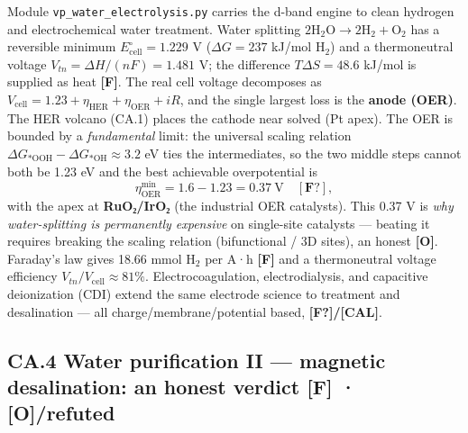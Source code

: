 \documentclass[
  10pt,
]{article}
\begin{document}
Module \texttt{vp\_water\_electrolysis.py} carries the d-band engine to
clean hydrogen and electrochemical water treatment. Water splitting
\(\mathrm{2H_2O\to2H_2+O_2}\) has a reversible minimum
\(E^\circ_{\text{cell}}=1.229\) V (\(\Delta G=237\) kJ/mol H\(_2\)) and
a thermoneutral voltage \(V_{tn}=\Delta H/(nF)=1.481\) V; the difference
\(T\Delta S=48.6\) kJ/mol is supplied as heat \textbf{{[}F{]}}. The real
cell voltage decomposes as
\(V_{\text{cell}}=1.23+\eta_{\text{HER}}+\eta_{\text{OER}}+iR\), and the
single largest loss is the \textbf{anode (OER)}. The HER volcano (CA.1)
places the cathode near solved (Pt apex). The OER is bounded by a
\emph{fundamental} limit: the universal scaling relation
\(\Delta G_{*\mathrm{OOH}}-\Delta G_{*\mathrm{OH}}\approx 3.2\) eV ties
the intermediates, so the two middle steps cannot both be 1.23 eV and
the best achievable overpotential is
\[ \eta_{\text{OER}}^{\min} = 1.6 - 1.23 = 0.37\ \text{V} \quad[\mathbf{F?}], \]
with the apex at \textbf{RuO₂/IrO₂} (the industrial OER catalysts). This
0.37 V is \emph{why water-splitting is permanently expensive} on
single-site catalysts --- beating it requires breaking the scaling
relation (bifunctional / 3D sites), an honest \textbf{{[}O{]}}.
Faraday's law gives 18.66 mmol H\(_2\) per A·h \textbf{{[}F{]}} and a
thermoneutral voltage efficiency \(V_{tn}/V_{\text{cell}}\approx 81\%\).
Electrocoagulation, electrodialysis, and capacitive deionization (CDI)
extend the same electrode science to treatment and desalination --- all
charge/membrane/potential based, \textbf{{[}F?{]}/{[}CAL{]}}.

\hypertarget{ca.4-water-purification-ii-magnetic-desalination-an-honest-verdict-f-orefuted}{%
\subsection{\texorpdfstring{CA.4 Water purification II --- magnetic
desalination: an honest verdict \textbf{{[}F{]} ·
{[}O{]}/refuted}}{CA.4 Water purification II --- magnetic desalination: an honest verdict {[}F{]} · {[}O{]}/refuted}}\label{ca.4-water-purification-ii-magnetic-desalination-an-honest-verdict-f-orefuted}}
\end{document}
